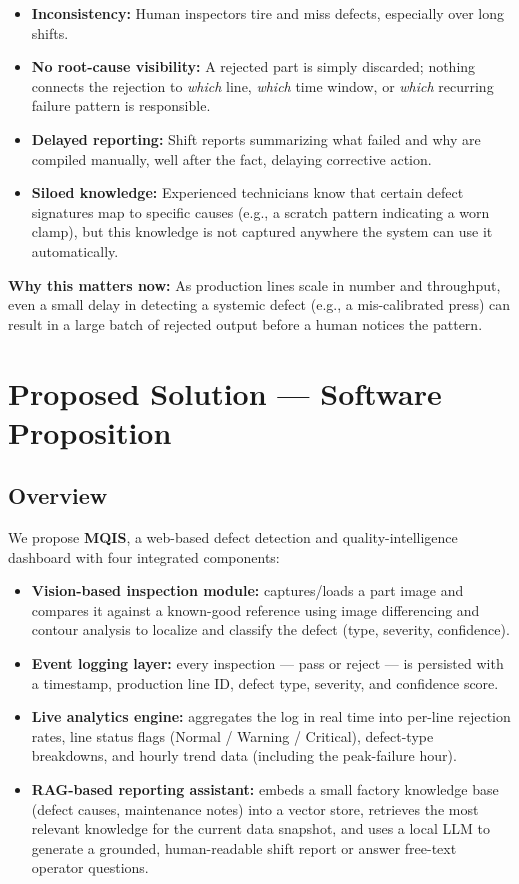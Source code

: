 \documentclass[11pt]{article}
\begin{document}
\begin{itemize}[leftmargin=*]
    \item \textbf{Inconsistency:} Human inspectors tire and miss defects, especially over long shifts.
    \item \textbf{No root-cause visibility:} A rejected part is simply discarded; nothing connects
    the rejection to \emph{which} line, \emph{which} time window, or \emph{which} recurring failure
    pattern is responsible.
    \item \textbf{Delayed reporting:} Shift reports summarizing what failed and why are compiled
    manually, well after the fact, delaying corrective action.
    \item \textbf{Siloed knowledge:} Experienced technicians know that certain defect signatures
    map to specific causes (e.g., a scratch pattern indicating a worn clamp), but this knowledge is
    not captured anywhere the system can use it automatically.
\end{itemize}

\noindent\textbf{Why this matters now:} As production lines scale in number and throughput, even a
small delay in detecting a systemic defect (e.g., a mis-calibrated press) can result in a large
batch of rejected output before a human notices the pattern.

\section{Proposed Solution --- Software Proposition}

\subsection{Overview}
We propose \textbf{MQIS}, a web-based defect detection and quality-intelligence dashboard with
four integrated components:
\begin{itemize}[leftmargin=*]
    \item \textbf{Vision-based inspection module:} captures/loads a part image and compares it
    against a known-good reference using image differencing and contour analysis to localize and
    classify the defect (type, severity, confidence).
    \item \textbf{Event logging layer:} every inspection --- pass or reject --- is persisted with a
    timestamp, production line ID, defect type, severity, and confidence score.
    \item \textbf{Live analytics engine:} aggregates the log in real time into per-line rejection
    rates, line status flags (Normal / Warning / Critical), defect-type breakdowns, and hourly
    trend data (including the peak-failure hour).
    \item \textbf{RAG-based reporting assistant:} embeds a small factory knowledge base (defect
    causes, maintenance notes) into a vector store, retrieves the most relevant knowledge for the
    current data snapshot, and uses a local LLM to generate a grounded, human-readable shift report
    or answer free-text operator questions.
\end{itemize}
\end{document}
